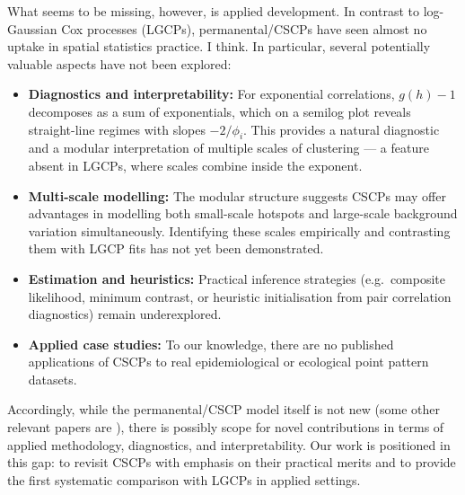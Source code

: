 \documentclass[11pt]{article}
\begin{document}
What seems to be missing, however, is applied development. 
In contrast to log-Gaussian Cox processes (LGCPs), 
permanental/CSCPs have seen almost no uptake in 
spatial statistics practice. I think.
In particular, several potentially valuable aspects have not been explored:
\begin{itemize}
	\item \textbf{Diagnostics and interpretability:} 
	For exponential correlations, $g(h)-1$ decomposes as a sum of exponentials, 
	which on a semilog plot reveals straight-line regimes with slopes $-2/\phi_i$. 
	This provides a natural diagnostic and a modular interpretation of multiple scales of clustering --- a feature absent in LGCPs, where scales combine inside the exponent.
	\item \textbf{Multi-scale modelling:} 
	The modular structure suggests CSCPs may offer advantages in modelling 
	both small-scale hotspots and large-scale background variation simultaneously. 
	Identifying these scales empirically and contrasting them with LGCP fits 
	has not yet been demonstrated.
	\item \textbf{Estimation and heuristics:} 
	Practical inference strategies (e.g.\ composite likelihood, minimum contrast, 
	or heuristic initialisation from pair correlation diagnostics) remain underexplored.
	\item \textbf{Applied case studies:} 
	To our knowledge, there are no published applications of CSCPs to real 
	epidemiological or ecological point pattern datasets. 
\end{itemize}

Accordingly, while the permanental/CSCP model itself is not new (some other relevant papers are \cite{WalderBishopICML2017,Nicolis2022,Eisenbaum2008}), 
there is possibly scope for novel contributions in terms of 
applied methodology, diagnostics, and interpretability. 
Our work is positioned in this gap: to revisit CSCPs with emphasis on their 
practical merits and to provide the first systematic comparison with LGCPs in applied settings.
\end{document}
